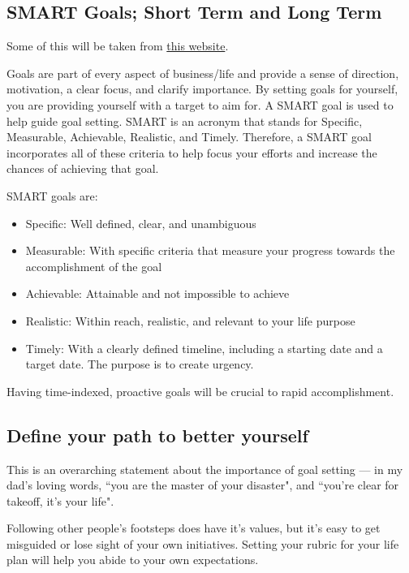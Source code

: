 \subsection{SMART Goals; Short Term and Long Term}

Some of this will be taken from \href{https://corporatefinanceinstitute.com/resources/knowledge/other/smart-goal/}{this website}.

Goals are part of every aspect of business/life and provide a sense of direction,
motivation, a clear focus, and clarify importance. By setting goals for
yourself, you are providing yourself with a target to aim for. A SMART goal
is used to help guide goal setting. SMART is an acronym that stands for Specific,
Measurable, Achievable, Realistic, and Timely. Therefore, a SMART goal incorporates
all of these criteria to help focus your efforts and increase the chances of
achieving that goal.

SMART goals are:

\begin{itemize}
\item{Specific: Well defined, clear, and unambiguous}
\item{Measurable: With specific criteria that measure your progress towards the accomplishment of the goal}
\item{Achievable: Attainable and not impossible to achieve}
\item{Realistic: Within reach, realistic, and relevant to your life purpose}
\item{Timely: With a clearly defined timeline, including a starting date and a target date. The purpose is to create urgency.}
\end{itemize}

Having time-indexed, proactive goals will be crucial to rapid accomplishment.

\subsection{Define your path to better yourself}

This is an overarching statement about the importance of goal setting ---
in my dad's loving words, ``you are the master of your disaster",
and ``you're clear for takeoff, it's your life".

Following other people's footsteps does have it's values, but it's easy to
get misguided or lose sight of your own initiatives. Setting your rubric for
your life plan will help you abide to your own expectations.


